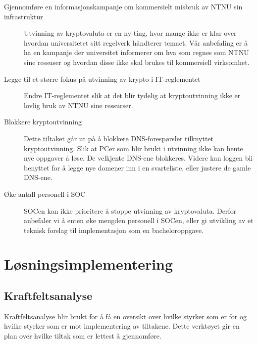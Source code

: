 \begin{description}
    \item[Gjennomføre en informasjonskampanje om kommersielt misbruk av NTNU sin infrastruktur] Utvinning av kryptovaluta er en ny ting, hvor mange ikke er klar over hvordan universitetet sitt regelverk håndterer temaet. Vår anbefaling er å ha en kampanje der universitet informerer om hva som regnes som NTNU sine ressuser og hvordan disse ikke skal brukes til kommersiell virksomhet.
    \item[Legge til et større fokus på utvinning av krypto i IT-reglementet] Endre IT-reglementet slik at det blir tydelig at kryptoutvinning ikke er lovlig bruk av NTNU sine ressurser. 
    \item[Blokkere kryptoutvinning] Dette tiltaket går ut på å blokkere DNS-forespørsler tilknyttet kryptoutvinning. Slik at PCer som blir brukt i utvinning ikke kan hente nye oppgaver å løse. De velkjente DNS-ene blokkeres. Videre kan loggen bli benyttet for å legge nye domener inn i en svarteliste, eller justere de gamle DNS-ene.
    \item[Øke antall personell i SOC] SOCen kan ikke prioritere å stoppe utvinning av kryptovaluta. Derfor anbefaler vi å enten øke mengden personell i SOCen, eller gi utvikling av et teknisk forslag til implementasjon som en bacheloroppgave.
\end{description}

\section{Løsningsimplementering}
\subsection{Kraftfeltsanalyse} 
Kraftfeltsanalyse blir brukt for å få en oversikt over hvilke styrker som er for og hvilke styrker som er mot implementering av tiltakene. Dette verktøyet gir en plan over hvilke tiltak som er lettest å gjennomføre.  

